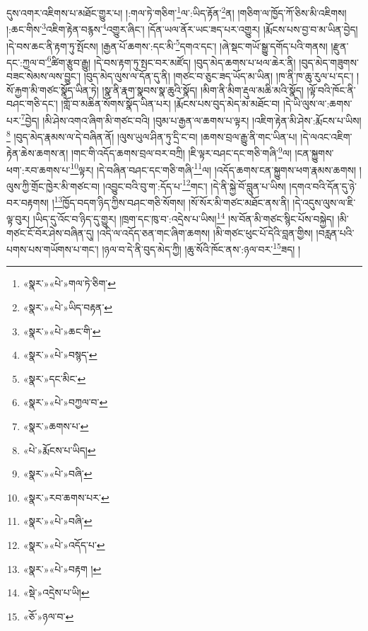 དུས་འགར་འཇིགས་པ་མཐོང་གྱུར་པ། །:གལ་ཏེ་གཅིག་\footnote{«སྣར་»«པེ་»གལ་ཏེ་ཅིག་}ལ་:ཡིད་རྟོན་\footnote{«སྣར་»«པེ་»ཡིད་བརྟན་}ན། །གཅིག་ལ་ཁྱོད་ཀོ་ཅིས་མི་འཇིགས། །:ཆང་གིས་\footnote{«སྣར་»«པེ་»ཆང་གི་}འཇིག་རྟེན་བརྙས་\footnote{«སྣར་»«པེ་»བསྙད་}འགྱུར་ཞིང་། །དོན་ཡལ་ནོར་ཡང་ཟད་པར་འགྱུར། །རྨོངས་པས་བྱ་བ་མ་ཡིན་བྱེད། །དེ་བས་ཆང་ནི་རྟག་ཏུ་སྤོངས། །རྒྱན་པོ་ཆགས་:དང་མི་\footnote{«སྣར་»དང་མིང་}དགའ་དང་། །ཞེ་སྡང་གཡོ་སྒྱུ་དགོད་པའི་གནས། །རྫུན་དང་:ཀྱལ་བ་\footnote{«སྣར་»«པེ་»བཀྱལ་བ་}ཚིག་རྩུབ་རྒྱུ། །དེ་བས་རྟག་ཏུ་སྤང་བར་མཛོད། །བུད་མེད་ཆགས་པ་ཕལ་ཆེར་ནི། །བུད་མེད་གཟུགས་བཟང་སེམས་ལས་བྱུང་། །བུད་མེད་ལུས་ལ་དོན་དུ་ནི། །གཙང་བ་ཅུང་ཟད་ཡོད་མ་ཡིན། །ཁ་ནི་ཁ་ཆུ་རུལ་པ་དང་། །སོ་རྐྱག་མི་གཙང་སྣོད་ཡིན་ཏེ། །སྣ་ནི་རྣག་སྣབས་སྣ་ཆུའི་སྣོད། །མིག་ནི་མིག་རྡུལ་མཆི་མའི་སྣོད། །ལྟོ་བའི་ཁོང་ནི་བཤང་གཅི་དང་། །གློ་བ་མཆིན་སོགས་སྣོད་ཡིན་པར། །རྨོངས་པས་བུད་མེད་མ་མཐོང་བ། །དེ་ཡི་ལུས་ལ་:ཆགས་པར་\footnote{«སྣར་»ཆགས་པ་}བྱེད། །མི་ཤེས་འགའ་ཞིག་མི་གཙང་བའི། །བུམ་པ་རྒྱན་ལ་ཆགས་པ་ལྟར། །འཇིག་རྟེན་མི་ཤེས་:རྨོངས་པ་ཡིས།\footnote{«པེ་»རྨོངས་པ་ཡིད།} །བུད་མེད་རྣམས་ལ་དེ་བཞིན་ནོ། །ལུས་ཡུལ་ཤིན་ཏུ་དྲི་ང་བ། །ཆགས་བྲལ་རྒྱུ་ནི་གང་ཡིན་པ། །དེ་ལའང་འཇིག་རྟེན་ཆེས་ཆགས་ན། །གང་གི་འདོད་ཆགས་བྲལ་བར་བཀྲི། །ཇི་ལྟར་བཤང་དང་གཅི་གཞི་\footnote{«སྣར་»«པེ་»བཞི་}ལ། །ངན་སྐྱུགས་ཕག་:རབ་ཆགས་པ་\footnote{«སྣར་»རབ་ཆགས་པར་}ལྟར། །དེ་བཞིན་བཤང་དང་གཅི་གཞི་\footnote{«སྣར་»«པེ་»བཞི་}ལ། །འདོད་ཆགས་ངན་སྐྱུགས་ཕག་རྣམས་ཆགས། །ལུས་ཀྱི་གྲོང་ཁྱེར་མི་གཙང་བ། །འབྱུང་བའི་བུ་ག་:དོད་པ་\footnote{«སྣར་»«པེ་»འདོད་པ་}གང་། །དེ་ནི་སྐྱེ་བོ་བླུན་པ་ཡིས། །དགའ་བའི་དོན་དུ་ཉེ་བར་བརྟགས། །\footnote{«སྣར་»«པེ་»བརྟག །}ཁྱོད་བདག་ཉིད་ཀྱིས་བཤང་གཅི་སོགས། །སོ་སོར་མི་གཙང་མཐོང་ནས་ནི། །དེ་འདུས་ལུས་ལ་ཇི་ལྟ་བུར། །ཡིད་དུ་འོང་བ་ཉིད་དུ་གྱུར། །ཁྲག་དང་ཁུ་བ་:འདྲེས་པ་ཡིས།\footnote{«སྡེ་»འདྲེས་པ་ཡི།} །ས་བོན་མི་གཙང་སྙིང་པོས་བསྐྱེད། །མི་གཙང་ངོ་བོར་ཤེས་བཞིན་དུ། །འདི་ལ་འདོད་ཅན་གང་ཞིག་ཆགས། །མི་གཙང་ཕུང་པོ་དེའི་བླན་གྱིས། །བརླན་པའི་པགས་པས་གཡོགས་པ་གང་། །ཉལ་བ་དེ་ནི་བུད་མེད་ཀྱི། །ཆུ་སོའི་ཁོང་ནས་:ཉལ་བར་\footnote{«ཅོ་»ཉལ་བ་}ཟད། །
